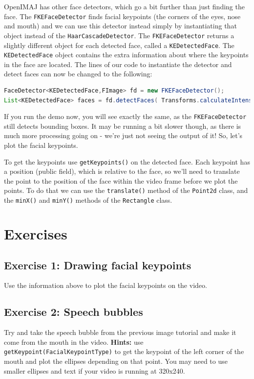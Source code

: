 \documentclass[10pt,a4paper,twoside,extrafontsizes]{memoir}
\begin{document}
OpenIMAJ has other face detectors, which go a bit further than just finding the face. 
The \verb+FKEFaceDetector+ finds facial keypoints (the corners of the eyes, nose and mouth) 
and we can use this detector instead simply by instantiating that object instead of the 
\verb+HaarCascadeDetector+. The \verb+FKEFaceDetector+ returns a slightly different object 
for each detected face, called a \verb+KEDetectedFace+. The \verb+KEDetectedFace+ object 
contains the extra information about where the keypoints in the face are located. 
The lines of our code to instantiate the detector and detect faces can now be changed to 
the following:
\begin{lstlisting}[language=java]
FaceDetector<KEDetectedFace,FImage> fd = new FKEFaceDetector();
List<KEDetectedFace> faces = fd.detectFaces( Transforms.calculateIntensity( frame ) );
\end{lstlisting}
If you run the demo now, you will see exactly the same, as the \verb+FKEFaceDetector+ 
still detects bounding boxes. It may be running a bit slower though, as there is much more 
processing going on - we're just not seeing the output of it! So, let's plot the facial keypoints.

To get the keypoints use \verb+getKeypoints()+ on the detected face. Each keypoint has a 
position (public field), which is relative to the face, so we'll need to translate the 
point to the position of the face within the video frame before we plot the points. 
To do that we can use the \verb+translate()+ method of the \verb+Point2d+ class, 
and the \verb+minX()+ and \verb+minY()+ methods of the \verb+Rectangle+ class.

\section*{Exercises}
\subsection*{Exercise 1: Drawing facial keypoints}
Use the information above to plot the facial keypoints on the video.

\subsection*{Exercise 2: Speech bubbles}
Try and take the speech bubble from the previous image tutorial and make it come from the mouth 
in the video. \textbf{Hints:} use \verb+getKeypoint(FacialKeypointType)+ to get the keypoint 
of the left corner of the mouth and plot the ellipses depending on that point. You may need to 
use smaller ellipses and text if your video is running at 320x240.
\end{document}
